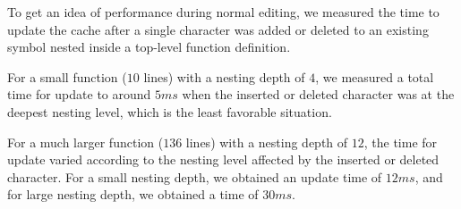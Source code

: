 To get an idea of performance during normal editing, we measured the
time to update the cache after a single character was added or deleted
to an existing symbol nested inside a top-level function definition.

For a small function ($10$ lines) with a nesting depth of $4$, we
measured a total time for update to around $5ms$ when the inserted or
deleted character was at the deepest nesting level, which is the least
favorable situation.

For a much larger function ($136$ lines) with a nesting depth of $12$,
the time for update varied according to the nesting level affected by
the inserted or deleted character.  For a small nesting depth, we
obtained an update time of $12ms$, and for large nesting depth, we
obtained a time of $30ms$.
